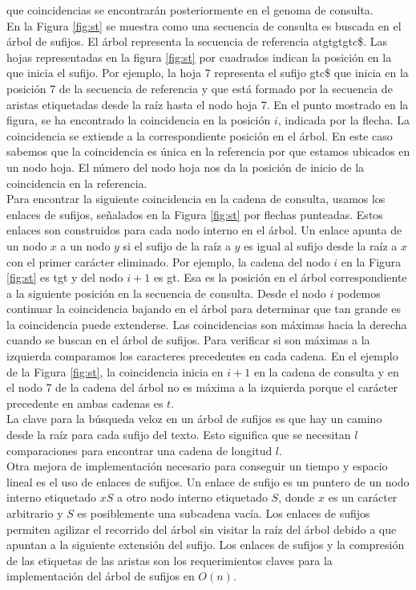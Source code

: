 \documentclass[12pt,a4paper]{article}
\begin{document}
que coincidencias se encontrarán posteriormente en el genoma de consulta.\\
\indent
En la Figura \ref{fig:st} se muestra como una secuencia de consulta es buscada en el árbol de sufijos. El
árbol representa la secuencia de referencia atgtgtgtc\$. Las hojas representadas en la figura \ref{fig:st} por cuadrados indican la
posición en la que inicia el sufijo. Por ejemplo, la hoja 7 representa el sufijo gtc\$ que inicia en la 
posición 7 de la secuencia de referencia y que está formado por la secuencia de aristas etiquetadas desde la
raíz hasta el nodo hoja 7. En el punto mostrado en la figura, se ha encontrado la coincidencia en la posición $i$,
indicada por la flecha. La coincidencia se extiende a la correspondiente posición en el árbol. En este caso sabemos
que la coincidencia es única en la referencia por que estamos ubicados en un nodo hoja. El número del nodo hoja
nos da la posición de inicio de la coincidencia en la referencia.\\
\indent
Para encontrar la siguiente coincidencia en la cadena de consulta, usamos los enlaces de sufijos, señalados en la Figura \ref{fig:st} por
flechas punteadas. Estos enlaces son construidos para cada nodo interno en el árbol. Un enlace apunta de un nodo
$x$ a un nodo $y$ si el sufijo de la raíz a $y$ es igual al sufijo desde la raíz a $x$ con el primer carácter 
eliminado. Por ejemplo, la cadena del nodo $i$ en la Figura \ref{fig:st} es tgt y del nodo $i+1$ es gt. Esa es la
posición en el árbol correspondiente a la siguiente posición en la secuencia de consulta. Desde el nodo $i$ podemos
continuar la coincidencia bajando en el árbol para determinar que tan grande es la coincidencia puede extenderse. Las 
coincidencias son máximas hacia la derecha cuando se buscan en el árbol de sufijos. Para verificar si son máximas a
la izquierda comparamos los caracteres precedentes en cada cadena. En el ejemplo de la Figura \ref{fig:st}, la
coincidencia inicia en $i+1$ en la cadena de consulta y en el nodo 7 de la cadena del árbol no es máxima a la izquierda
porque el carácter precedente en ambas cadenas es $t$.\\
\indent
La clave para la búsqueda veloz en un árbol de sufijos es que 
hay un camino desde la raíz para cada sufijo del texto. Esto significa que se 
necesitan $l$ comparaciones para encontrar una cadena de longitud $l$.\\
\indent
Otra mejora de implementación necesario para conseguir un tiempo y espacio 
lineal es el uso de enlaces de sufijos. Un enlace de sufijo es un puntero de un 
nodo interno etiquetado $xS$ a otro nodo interno etiquetado $S$, donde $x$ es un 
carácter arbitrario y $S$ es posiblemente una subcadena vacía. Los enlaces de 
sufijos permiten agilizar el recorrido del árbol sin visitar la raíz del árbol 
debido a que apuntan a la siguiente extensión del sufijo. Los enlaces de sufijos 
y la compresión de las etiquetas de las aristas son los requerimientos claves 
para la implementación del árbol de sufijos en $O(n)$.\\
\end{document}
